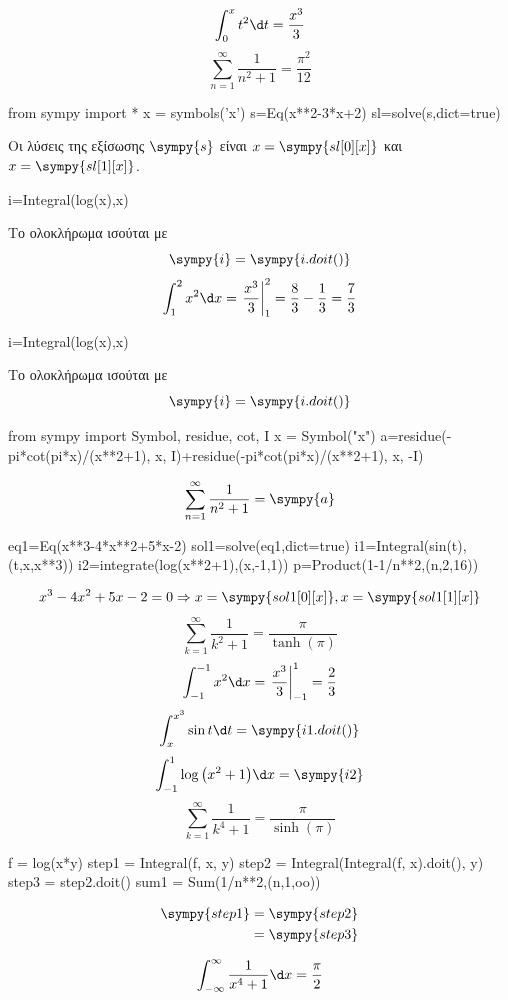 \documentclass[twoside,nofonts,internet,math,spyros]{frontisthrio}
\begin{document}
\[ \int_{0}^{x}{t^2\d t}=\frac{x^3}{3} \]
\[ \sum_{n=1}^{\infty}{\frac{1}{n^2+1}}=\frac{\pi^2}{12} \]
\begin{sympycode}
from sympy import *
x = symbols('x')
s=Eq(x**2-3*x+2)
sl=solve(s,dict=true)
\end{sympycode}
Οι λύσεις της εξίσωσης $ \sympy{s} $ είναι $ x=\sympy{sl[0][x]} $ και $ x=\sympy{sl[1][x]} $.\\
\begin{sympycode}
i=Integral(log(x),x)
\end{sympycode}
Το ολοκλήρωμα ισούται με \[ \sympy{i}=\sympy{i.doit()} \]
\[ \int_{1}^{2}{x^2\d x}=\left.\frac{x^3}{3}\right|_{1}^{2}=\frac{8}{3}-\frac{1}{3}=\frac{7}{3} \]
\begin{sympycode}
i=Integral(log(x),x)
\end{sympycode}
Το ολοκλήρωμα ισούται με \[ \sympy{i}=\sympy{i.doit()} \]
\begin{sympycode}
from sympy import Symbol, residue, cot, I
x = Symbol("x")
a=residue(-pi*cot(pi*x)/(x**2+1), x, I)+residue(-pi*cot(pi*x)/(x**2+1), x, -I)
\end{sympycode}
\[ \sum_{n=1}^{\infty}{\frac{1}{n^2+1}}=\sympy{a} \]
\begin{sympycode}
eq1=Eq(x**3-4*x**2+5*x-2)
sol1=solve(eq1,dict=true)
i1=Integral(sin(t),(t,x,x**3))
i2=integrate(log(x**2+1),(x,-1,1))
p=Product(1-1/n**2,(n,2,16))
\end{sympycode}
\[ x^3-4x^2+5x-2=0\Rightarrow x=\sympy{sol1[0][x]},x=\sympy{sol1[1][x]} \]
\[ \sum_{k=1}^{\infty}{\frac{1}{k^2+1}}=\frac{\pi}{\tanh{(\pi)}} \]
\[ \int_{-1}^{-1}{x^2\d x}=\left.\frac{x^3}{3}\right|_{-1}^{1}=\frac{2}{3} \]
\[ \int_{x}^{x^3}{\sin{t}\d t}=\sympy{i1.doit()} \]
\[ \int_{-1}^{1}{\log{\left(x^2+1\right)}\d x}=\sympy{i2} \]
\[ \sum_{k=1}^{\infty}{\frac{1}{k^4+1}}=\frac{\pi}{\sinh{(\pi)}} \]
\begin{sympycode}
f = log(x*y)
step1 = Integral(f, x, y)
step2 = Integral(Integral(f, x).doit(), y)
step3 = step2.doit()
sum1 = Sum(1/n**2,(n,1,oo))
\end{sympycode}
\begin{align*}
\sympy{step1} &= \sympy{step2} \\
&= \sympy{step3}
\end{align*}

\[ \int_{-\infty}^{\infty}{\frac{1}{x^4+1}\d x}=\frac{\pi}{2} \]
\end{document}
